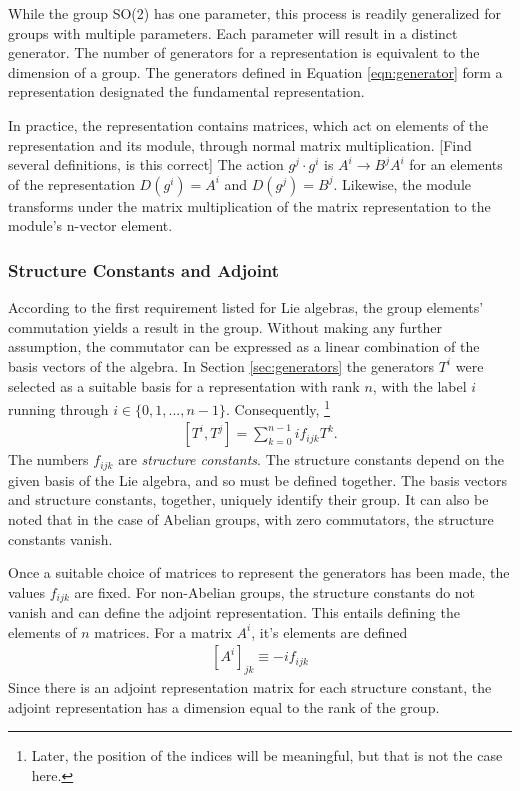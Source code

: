 While the group SO(2) has one parameter, this process is readily generalized for groups with multiple parameters. Each parameter will result in a distinct generator.
The number of generators for a representation is equivalent to the dimension of a group.
The generators defined in Equation \ref{eqn:generator} form a representation designated the fundamental representation.

In practice, the representation contains \nxn matrices, which act on elements of the representation and its module, through normal matrix multiplication. {\color{red} [Find several definitions, is this correct]}
The action $g^j\cdot g^i$ is $A^i\to B^jA^i$ for an elements of the representation $D(g^i)=A^i$ and $D(g^j)=B^j$.
Likewise, the module transforms under the matrix multiplication of the \nxn matrix representation to the module's n-vector element. \check




\subsubsection{Structure Constants and Adjoint}\label{sec:adjoint}
According to the first requirement listed for Lie algebras, the group elements' commutation yields a result in the group.
Without making any further assumption, the commutator can be expressed as a linear combination of the basis vectors of the algebra.
In Section \ref{sec:generators} the generators $T^i$ were selected as a suitable basis for a representation with rank $n$, with the label $i$ running through $i\in\{0,1,...,n-1\}$.
Consequently, \footnote{Later, the position of the indices will be meaningful, but that is not the case here.}
\begin{equation}\begin{split}\label{eqn:structure}
    [T^i,T^j]=\sum_{k=0}^{n-1}if_{ijk}T^k.
\end{split}\end{equation} 
The numbers $f_{ijk}$ are \emph{structure constants}. 
The structure constants depend on the given basis of the Lie algebra, and so must be defined together.
The basis vectors and structure constants, together, uniquely identify their group.
It can also be noted that in the case of Abelian groups, with zero commutators, the structure constants vanish.

Once a suitable choice of matrices to represent the generators has been made, the values $f_{ijk}$ are fixed.
For non-Abelian groups, the structure constants do not vanish and can define the adjoint representation.
This entails defining the \nxn elements of $n$ matrices.
For a matrix $A^i$, it's elements are defined
\begin{equation}\begin{split}\label{eqn:adjoint}
[A^i]_{jk}\equiv-if_{ijk}
\end{split}\end{equation} 
Since there is an adjoint representation matrix for each structure constant, the adjoint representation has a dimension equal to the rank of the group.

